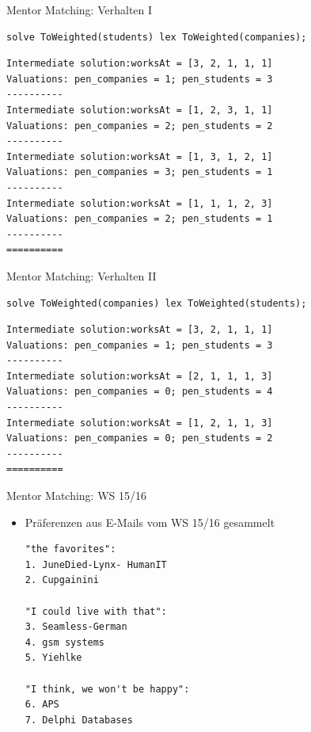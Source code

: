 \begin{frame}[fragile]{Mentor Matching: Verhalten I}
\begin{lstlisting}
solve ToWeighted(students) lex ToWeighted(companies);
\end{lstlisting}
\begin{Verbatim}[fontsize=\small]
Intermediate solution:worksAt = [3, 2, 1, 1, 1]
Valuations: pen_companies = 1; pen_students = 3
----------
Intermediate solution:worksAt = [1, 2, 3, 1, 1]
Valuations: pen_companies = 2; pen_students = 2
----------
Intermediate solution:worksAt = [1, 3, 1, 2, 1]
Valuations: pen_companies = 3; pen_students = 1
----------
Intermediate solution:worksAt = [1, 1, 1, 2, 3]
Valuations: pen_companies = 2; pen_students = 1
----------
==========
\end{Verbatim}

\end{frame}

\begin{frame}[fragile]{Mentor Matching: Verhalten II}
\begin{lstlisting}
solve ToWeighted(companies) lex ToWeighted(students);
\end{lstlisting}
\begin{Verbatim}[fontsize=\small]
Intermediate solution:worksAt = [3, 2, 1, 1, 1]
Valuations: pen_companies = 1; pen_students = 3
----------
Intermediate solution:worksAt = [2, 1, 1, 1, 3]
Valuations: pen_companies = 0; pen_students = 4
----------
Intermediate solution:worksAt = [1, 2, 1, 1, 3]
Valuations: pen_companies = 0; pen_students = 2
----------
==========
\end{Verbatim}

\end{frame}


\begin{frame}[fragile]{Mentor Matching: WS 15/16}
\begin{itemize}
\item Präferenzen aus E-Mails vom WS 15/16 gesammelt

\begin{parchment}
\begin{verbatim}
"the favorites":
1. JuneDied-Lynx- HumanIT
2. Cupgainini
 
"I could live with that":
3. Seamless-German
4. gsm systems
5. Yiehlke
 
"I think, we won't be happy":
6. APS
7. Delphi Databases
\end{verbatim} 
\end{parchment}
\end{itemize}
\end{frame}

